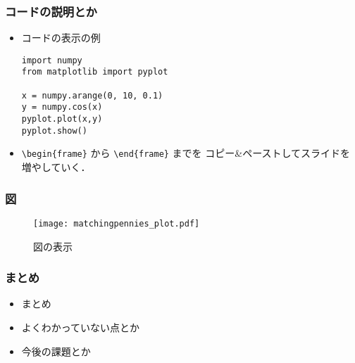 \documentclass[dvipdfmx,fleqn]{beamer}
\begin{document}
\begin{frame}[containsverbatim]%
\frametitle{コードの説明とか}
\begin{itemize}\setlength{\parskip}{0.5em}
\item
コードの表示の例
\begin{verbatim}
import numpy
from matplotlib import pyplot

x = numpy.arange(0, 10, 0.1)
y = numpy.cos(x)
pyplot.plot(x,y)
pyplot.show()
\end{verbatim}

\item
\verb|\begin{frame}| から \verb|\end{frame}| までを
コピー\&ペーストしてスライドを増やしていく．
\end{itemize}
\end{frame}



\begin{frame}
\frametitle{図}
\begin{figure}
 \centering
 \texttt{[image: matchingpennies\_plot.pdf]}
 \caption{図の表示}
 \label{fig:matchingpennies_plot}
\end{figure}
\end{frame}



\begin{frame}
\frametitle{まとめ}
\begin{itemize}\setlength{\parskip}{0.5em}
\item
まとめ

\item
よくわかっていない点とか

\item
今後の課題とか
\end{itemize}
\end{frame}
\end{document}
